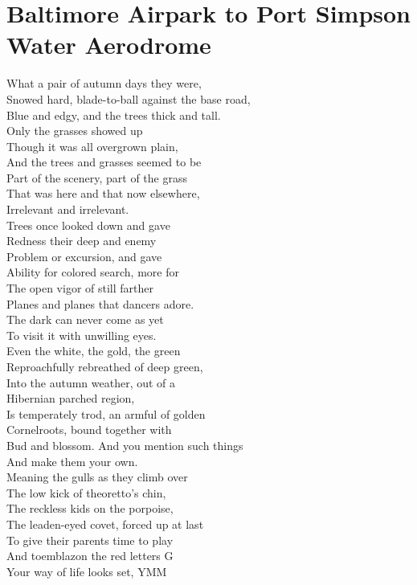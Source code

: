 \documentclass[smalldemyvopaper,11pt,twoside,onecolumn,openright,extrafontsizes]{memoir}
\begin{document}
\chapter{Baltimore Airpark to Port Simpson Water Aerodrome}
What a pair of autumn days they were,
\\Snowed hard, blade-to-ball against the base road,
\\Blue and edgy, and the trees thick and tall.
\\Only the grasses showed up
\\Though it was all overgrown plain,
\\And the trees and grasses seemed to be
\\Part of the scenery, part of the grass
\\That was here and that now elsewhere,
\\Irrelevant and irrelevant.
\\Trees once looked down and gave
\\Redness their deep and enemy
\\Problem or excursion, and gave
\\Ability for colored search, more for
\\The open vigor of still farther
\\Planes and planes that dancers adore.
\\The dark can never come as yet
\\To visit it with unwilling eyes.
\\Even the white, the gold, the green
\\Reproachfully rebreathed of deep green,
\\Into the autumn weather, out of a
\\Hibernian parched region,
\\Is temperately trod, an armful of golden
\\Cornelroots, bound together with
\\Bud and blossom. And you mention such things
\\And make them your own.
\\Meaning the gulls as they climb over
\\The low kick of theoretto's chin,
\\The reckless kids on the porpoise,
\\The leaden-eyed covet, forced up at last
\\To give their parents time to play
\\And toemblazon the red letters G
\\Your way of life looks set, YMM
\end{document}
